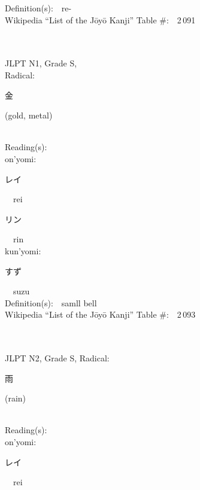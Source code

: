 \begin{multicols}{2}
Definition(s):\ \ re- \\
Wikipedia ``List of the J\=oy\=o Kanji'' Table \#:\ \ 2\,091 \\
\ \ \\
{\fontsize{34pt}{40pt}  }\ \ \\
{JLPT N1, Grade S, \\Radical:\ \ {\begin{CJK}{UTF8}{min} 金 \end{CJK}} (gold, metal) } \\
Reading(s):\ \ \\
{\hspace*{1em}}on'yomi:\ \ \\
{\hspace*{2em}}{\begin{CJK}{UTF8}{min} レイ \end{CJK}}\ \ rei\ \ \\
{\hspace*{2em}}{\begin{CJK}{UTF8}{min} リン \end{CJK}}\ \ rin\ \ \\
{\hspace*{1em}}kun'yomi:\ \ \\
{\hspace*{2em}}{\begin{CJK}{UTF8}{min} すず \end{CJK}}\ \ suzu\ \ \\
Definition(s):\ \ samll bell \\
Wikipedia ``List of the J\=oy\=o Kanji'' Table \#:\ \ 2\,093 \\
\ \ \\
{\fontsize{34pt}{40pt}  }\ \ \\  %
{JLPT N2, Grade S, Radical:\ \ {\begin{CJK}{UTF8}{min} 雨 \end{CJK}} (rain) } \\
Reading(s):\ \ \\
{\hspace*{1em}}on'yomi:\ \ \\
{\hspace*{2em}}{\begin{CJK}{UTF8}{min} レイ \end{CJK}}\ \ rei\ \ \\

\end{multicols}
